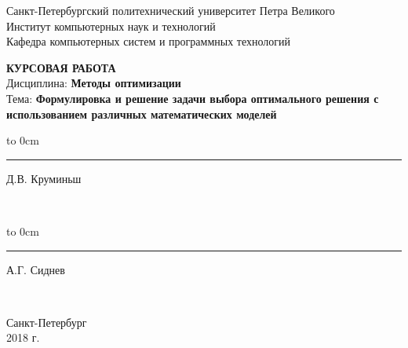 	\begin{titlepage}
		\begin{center}
			\large {Санкт-Петербургский политехнический университет Петра Великого\\
				Институт компьютерных наук и технологий}\\
				Кафедра компьютерных систем и программных технологий
		\end{center}

		\vfill
		\begin{center}
			\large{\textbf{КУРСОВАЯ РАБОТА} \\ \vspace*{2cm}
			Дисциплина: \textbf{Методы оптимизации}\\
			Тема: \textbf{Формулировка и решение задачи выбора оптимального решения с использованием различных математических моделей}}
		\end{center}
		
		\vfill
		
		\hfill\parbox{9 cm}{\hspace*{3cm}\hbox to 0cm{\raisebox{-1em}{\small(подпись)}}\hspace*{-0.8cm}\rule{3cm}{0.8pt} Д.В. Круминьш}\\[0.6cm]
		
		 \hfill\parbox{9 cm}{\hspace*{3cm}\hbox to 0cm{\raisebox{-1em}{\small(подпись)}}\hspace*{-0.8cm}\rule{3cm}{0.8pt} А.Г. Сиднев}\\[0.6cm]
		
		\vspace{\fill}
		\begin{center}
			Санкт-Петербург \\ 2018 г.
		\end{center}
	\end{titlepage}
\setcounter{page}{3}